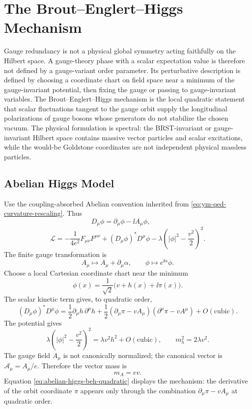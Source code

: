 \section{The Brout--Englert--Higgs Mechanism}
\label{sec:beh-mechanism}

Gauge redundancy is not a physical global symmetry acting faithfully on the
Hilbert space.  A gauge-theory phase with a scalar expectation value is
therefore not defined by a gauge-variant order parameter.  Its perturbative
description is defined by choosing a coordinate chart on field space near a
minimum of the gauge-invariant potential, then fixing the gauge or passing to
gauge-invariant variables.  The Brout--Englert--Higgs mechanism is the local
quadratic statement that scalar fluctuations tangent to the gauge orbit supply
the longitudinal polarizations of gauge bosons whose generators do not
stabilize the chosen vacuum.  The physical formulation is spectral: the
BRST-invariant or gauge-invariant Hilbert space contains massive vector
particles and scalar excitations, while the would-be Goldstone coordinates are
not independent physical massless particles.

\subsection{Abelian Higgs Model}

Use the coupling-absorbed Abelian convention inherited from
\eqref{eq:ym-qed-curvature-rescaling}.  Thus
\[
  D_\mu\phi=\partial_\mu\phi-\ii A_\mu\phi,
  \qquad
\]
\begin{equation}
  \mathcal L
  =
  -\frac1{4e^2}F_{\mu\nu}F^{\mu\nu}
  +(D_\mu\phi)^*D^\mu\phi
  -\lambda\left(|\phi|^2-\frac{v^2}{2}\right)^2 .
  \label{eq:abelian-higgs-lagrangian-beh}
\end{equation}
The finite gauge transformation is
\[
  A_\mu\mapsto A_\mu+\partial_\mu\alpha,
  \qquad
  \phi\mapsto e^{\ii\alpha}\phi .
\]
Choose a local Cartesian coordinate chart near the minimum
\[
  \phi(x)=\frac1{\sqrt2}\bigl(v+h(x)+\ii\pi(x)\bigr).
\]
The scalar kinetic term gives, to quadratic order,
\begin{equation}
  (D_\mu\phi)^*D^\mu\phi
  =
  \frac12\partial_\mu h\,\partial^\mu h
  +
  \frac12(\partial_\mu\pi-vA_\mu)(\partial^\mu\pi-vA^\mu)
  +O(\text{cubic}).
  \label{eq:abelian-higgs-beh-quadratic}
\end{equation}
The potential gives
\[
  \lambda\left(|\phi|^2-\frac{v^2}{2}\right)^2
  =
  \lambda v^2h^2+O(\text{cubic}),
  \qquad
  m_h^2=2\lambda v^2 .
\]
The gauge field \(A_\mu\) is not canonically normalized; the canonical vector
is \(\mathcal A_\mu=A_\mu/e\).  Therefore the vector mass is
\[
  m_A=ev .
\]
Equation \eqref{eq:abelian-higgs-beh-quadratic} displays the mechanism:
the derivative of the orbit coordinate \(\pi\) appears only through the
combination \(\partial_\mu\pi-vA_\mu\) at quadratic order.

